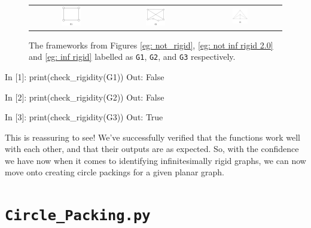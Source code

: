 \begin{figure}
    \centering
    \begin{tabular}{c c c}
        \includegraphics[width = 0.25\textwidth]{Chapter 4/6. not_rigid.png} 
        & \includegraphics[width = 0.25\textwidth]{Chapter 4/7. not_inf_rigid_2.0.png} &
        \includegraphics[width=0.2\textwidth]{Chapter 4/8. inf_rigid.png}        
    \end{tabular}
    \caption{The frameworks from Figures \ref{eg: not_rigid}, \ref{eg: not inf rigid 2.0} and \ref{eg: inf rigid} labelled as \texttt{G1}, \texttt{G2}, and \texttt{G3} respectively.}
\end{figure}

\begin{code}
In [1]: print(check_rigidity(G1))
Out: False 

In [2]: print(check_rigidity(G2))
Out: False

In [3]: print(check_rigidity(G3))
Out: True
\end{code}

\begin{flushleft}
This is reassuring to see! We've successfully verified that the functions work well with each other, and that their outputs are as expected. So, with the confidence we have now when it comes to identifying infinitesimally rigid graphs, we can now move onto creating circle packings for a given planar graph. 
\end{flushleft}

\section{\texttt{Circle\_Packing.py}}

